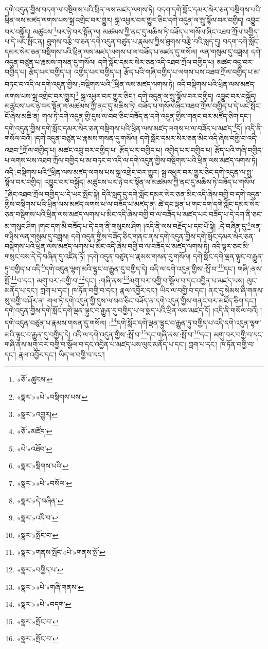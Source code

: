 དགེ་འདུན་གྱིས་བདག་ལ་བསྡིགས་པའི་ཕྲིན་ལས་མཛད་ལགས་ཏེ། བདག་དགེ་སློང་དམར་སེར་ཅན་བསྡིགས་པའི་ཕྲིན་ལས་མཛད་ལགས་པས་སྐྲ་འགྲེང་བར་གྱུར། སྐྲ་འཕྱར་བར་གྱུར་ཅིང་དགེ་འདུན་ལ་སྤུ་སྙོལ་བར་བགྱིད། འབྱུང་བར་བསྐྱོད། མཚུངས་\footnote{«ཅོ་»ཚུངས་}པར་ཉེ་བར་སྟོན་ལ། མཚམས་ཀྱི་ནང་དུ་མཆིས་ཏེ་བཟོད་པ་གསོལ་ཞིང་འཐབ་ཀྲོལ་བགྱིད་པ་དེ་ཡང་སྤོང་ན། ཐུགས་བརྩེ་བ་ཅན་དགེ་འདུན་བཙུན་པ་རྣམས་ཀྱིས་ཐུགས་བརྩེ་བའི་སླད་དུ། བདག་དགེ་སློང་དམར་སེར་ཅན་བསྡིགས་པའི་ཕྲིན་ལས་མཛད་ལགས་པ་ལ་བཟོད་པ་མཛད་དུ་གསོལ། ལན་གསུམ་དུ་བཟླས། དགེ་འདུན་བཙུན་པ་རྣམས་གསན་དུ་གསོལ། དགེ་སློང་དམར་སེར་ཅན་འདི་འཐབ་ཀྲོལ་བགྱིད་པ། མཚང་འབྲུ་བར་བགྱིད་པ། རྩོད་པར་བགྱིད་པ། འགྱེད་པར་བགྱིད་པ། རྩོད་པའི་གཞི་བགྱིད་པ་ལགས་པས་འཐབ་ཀྲོལ་བགྱིད་པ་མ་བཏང་བ་འདི་ལ་དགེ་འདུན་གྱིས་:བསྡིགས་པའི་\footnote{«སྣར་»«པེ་»བསྡིགས་པས་}ཕྲིན་ལས་མཛད་ལགས་ཏེ། འདི་བསྡིགས་པའི་ཕྲིན་ལས་མཛད་ལགས་པས་སྐྲ་འགྲེང་བར་གྱུར།\footnote{«སྣར་»འགྱུར།} སྐྲ་འཕྱར་བར་གྱུར་ཅིང་། དགེ་འདུན་ལ་སྤུ་སྙོལ་བར་བགྱིད། འབྱུང་བར་བསྐྱོད། མཚུངས་པར་ཉེ་བར་སྟོན་ལ་མཚམས་ཀྱི་ནང་དུ་མཆིས་ཏེ། བཟོད་པ་གསོལ་ཞིང་འཐབ་ཀྲོལ་བགྱིད་པ་དེ་ཡང་སྤོང་ངོ་ཞེས་མཆི་ན། གལ་ཏེ་དགེ་འདུན་གྱི་དུས་ལ་བབ་ཅིང་བཟོད་ན་དགེ་འདུན་གྱིས་གནང་བར་མཛོད་ཅིག་དང་། དགེ་འདུན་གྱིས་དགེ་སློང་དམར་སེར་ཅན་བསྡིགས་པའི་ཕྲིན་ལས་མཛད་ལགས་པ་ལ་བཟོད་པ་མཛད་\footnote{«ཅོ་»མཛོད་}དོ། །འདི་ནི་གསོལ་བའོ། །དགེ་འདུན་བཙུན་པ་རྣམས་གསན་དུ་གསོལ། དགེ་སློང་དམར་སེར་ཅན་མིང་འདི་ཞེས་བགྱི་བ་འདི་འཐབ་\footnote{«པེ་»འཐོབ་}ཀྲོལ་བགྱིད་པ། མཚང་འབྲུ་བར་བགྱིད་པ། རྩོད་པར་བགྱིད་པ། འགྱེད་པར་བགྱིད་པ། རྩོད་པའི་གཞི་བགྱིད་པ་ལགས་པས་འཐབ་ཀྲོལ་བགྱིད་པ་མ་བཏང་བ་འདི་ལ་དགེ་འདུན་གྱིས་བསྡིགས་པའི་ཕྲིན་ལས་མཛད་ལགས་ཏེ། འདི་:བསྡིགས་པའི་\footnote{«སྣར་»སྡིགས་པའི་}ཕྲིན་ལས་མཛད་ལགས་པས་སྐྲ་འགྲེང་བར་གྱུར། སྐྲ་འཕྱར་བར་གྱུར་ཅིང་དགེ་འདུན་ལ་སྤུ་སྙོལ་བར་བགྱིད། འབྱུང་བར་བསྐྱོད། མཚུངས་པར་ཉེ་བར་སྟོན་ལ་མཚམས་ཀྱི་ནང་དུ་མཆིས་ཏེ་བཟོད་པ་གསོལ་\footnote{«སྣར་»«པེ་»བསོལ་}ཞིང་འཐབ་ཀྲོལ་བགྱིད་པ་དེ་ཡང་སྤོང་སྟེ། དེའི་སླད་དུ་དགེ་སློང་དམར་སེར་ཅན་མིང་འདི་ཞེས་བགྱི་བ་དགེ་འདུན་གྱིས་བསྡིགས་པའི་ཕྲིན་ལས་མཛད་ལགས་པ་ལ་བཟོད་པ་མཛད་ན། ཚེ་དང་ལྡན་པ་གང་དག་དགེ་སློང་དམར་སེར་ཅན་བསྡིགས་པའི་ཕྲིན་ལས་མཛད་ལགས་པ་མིང་འདི་ཞེས་བགྱི་བ་ལ་བཟོད་པ་མཛད་པར་བཟོད་པ་དེ་དག་ནི་ཅང་མ་གསུང་ཤིག །གང་དག་མི་བཟོད་པ་དེ་དག་ནི་གསུངས་ཤིག །འདི་ནི་ལས་བརྗོད་པ་དང་པོ་སྟེ། :དེ་བཞིན་དུ་\footnote{«སྣར་»དེ་བཞིན་}ལན་གཉིས་ལན་གསུམ་དུ་བཟླས། དགེ་འདུན་གྱིས་བཟོད་ཅིང་གནང་ནས་དགེ་འདུན་གྱིས་དགེ་སློང་དམར་སེར་ཅན་བསྡིགས་པའི་ཕྲིན་ལས་མཛད་ལགས་པ་མིང་འདི་ཞེས་བགྱི་བ་ལ་བཟོད་པ་མཛད་ལགས་ཏེ། འདི་ལྟར་ཅང་མི་གསུང་བས་དེ་དེ་བཞིན་དུ་འཛིན་ཏོ། །དགེ་འདུན་བཙུན་པ་རྣམས་གསན་དུ་གསོལ། དགེ་སློང་དགེ་ལྡན་ལྟུང་བ་རྒྱུན་ཏུ་བགྱིད་པ་འདི་\footnote{«སྣར་»འདི་བ་}དགེ་འདུན་ལྷག་མའི་ལྟུང་བ་རྒྱུན་དུ་བགྱིད་དེ། འདི་ལ་དགེ་འདུན་གྱིས་:སྤོ་བ་\footnote{«སྣར་»སྤོང་བ་}དང་། གཞི་:ནས་སྤོ་\footnote{«སྣར་»གནས་སྤོང་«པེ་»གནས་སྤོ་}བ་དང་། མགུ་བར་:བགྱི་བ་\footnote{«སྣར་»བགྱིད་པ་}དང་། :གཞི་ནས་\footnote{«སྣར་»«པེ་»གཞི་གནས་}མགུ་བར་བགྱི་བ་སྩོལ་བ་དང་འབྱིན་པ་མཛད་པས། ལུང་མནོད་པ་དང་། ཀླག་པ་དང་། ཁ་ཏོན་བགྱི་བ་དང་། རྣལ་འབྱོར་དང་། ཡིད་ལ་བགྱི་བ་དང་། ནང་དུ་སེམས་ཞི་གནས་སུ་བགྱི་བ་ཤོར་ན། གལ་ཏེ་དགེ་འདུན་གྱི་དུས་ལ་བབ་ཅིང་བཟོད་ན་དགེ་འདུན་གྱིས་གནང་བར་མཛོད་ཅིག་དང་། དགེ་འདུན་གྱིས་དགེ་སློང་དགེ་ལྡན་ལྟུང་བ་རྒྱུན་དུ་བགྱིད་པ་ལ་སྨད་པའི་ཕྲིན་ལས་མཛད་དོ། །འདི་ནི་གསོལ་བའོ། །དགེ་འདུན་བཙུན་པ་རྣམས་གསན་དུ་གསོལ། :\footnote{«སྣར་»«པེ་»བདག་}དགེ་སློང་དགེ་ལྡན་ལྟུང་བ་རྒྱུན་ཏུ་བགྱིད་པ་འདི་དགེ་འདུན་ལྷག་མའི་ལྟུང་བ་རྒྱུན་དུ་བགྱིད་དེ། འདི་ལ་དགེ་འདུན་གྱིས་:སྤོ་བ་\footnote{«སྣར་»སྤོང་བ་}དང་གཞི་ནས་:སྤོ་བ་\footnote{«སྣར་»སྤོང་བ་}དང་། མགུ་བར་བགྱི་བ་དང་གཞི་ནས་མགུ་བར་བགྱི་བ་སྩོལ་བ་དང་འབྱིན་པ་མཛད་པས་ལུང་མནོད་པ་དང་། ཀླག་པ་དང་། ཁ་ཏོན་བགྱི་བ་དང་། རྣལ་འབྱོར་དང་། ཡིད་ལ་བགྱི་བ་དང་། 